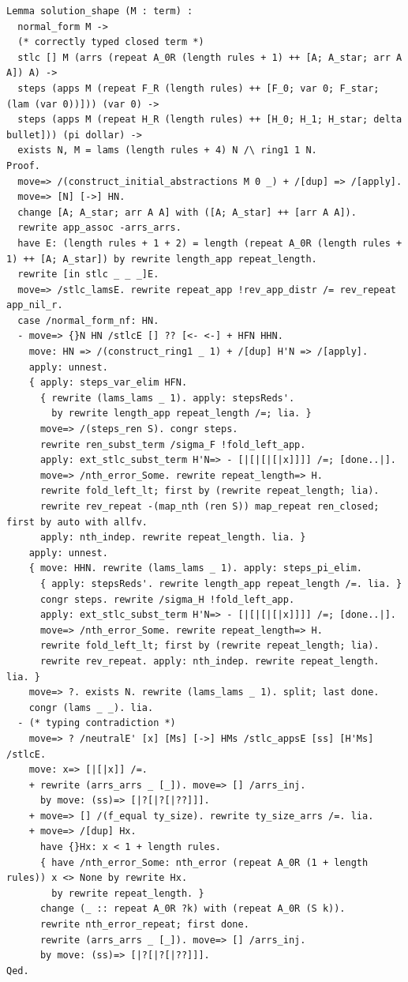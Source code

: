 \documentclass[10pt,a4paper]{amsart}
\begin{document}
\begin{lstlisting}
Lemma solution_shape (M : term) :
  normal_form M ->
  (* correctly typed closed term *)
  stlc [] M (arrs (repeat A_0R (length rules + 1) ++ [A; A_star; arr A A]) A) ->
  steps (apps M (repeat F_R (length rules) ++ [F_0; var 0; F_star; (lam (var 0))])) (var 0) ->
  steps (apps M (repeat H_R (length rules) ++ [H_0; H_1; H_star; delta bullet])) (pi dollar) ->
  exists N, M = lams (length rules + 4) N /\ ring1 1 N.
Proof.
  move=> /(construct_initial_abstractions M 0 _) + /[dup] => /[apply].
  move=> [N] [->] HN.
  change [A; A_star; arr A A] with ([A; A_star] ++ [arr A A]).
  rewrite app_assoc -arrs_arrs.
  have E: (length rules + 1 + 2) = length (repeat A_0R (length rules + 1) ++ [A; A_star]) by rewrite length_app repeat_length.
  rewrite [in stlc _ _ _]E.
  move=> /stlc_lamsE. rewrite repeat_app !rev_app_distr /= rev_repeat app_nil_r.
  case /normal_form_nf: HN.
  - move=> {}N HN /stlcE [] ?? [<- <-] + HFN HHN.
    move: HN => /(construct_ring1 _ 1) + /[dup] H'N => /[apply].
    apply: unnest.
    { apply: steps_var_elim HFN.
      { rewrite (lams_lams _ 1). apply: stepsReds'.
        by rewrite length_app repeat_length /=; lia. }
      move=> /(steps_ren S). congr steps.
      rewrite ren_subst_term /sigma_F !fold_left_app.
      apply: ext_stlc_subst_term H'N=> - [|[|[|[|x]]]] /=; [done..|].
      move=> /nth_error_Some. rewrite repeat_length=> H.
      rewrite fold_left_lt; first by (rewrite repeat_length; lia).
      rewrite rev_repeat -(map_nth (ren S)) map_repeat ren_closed; first by auto with allfv.
      apply: nth_indep. rewrite repeat_length. lia. }
    apply: unnest.
    { move: HHN. rewrite (lams_lams _ 1). apply: steps_pi_elim.
      { apply: stepsReds'. rewrite length_app repeat_length /=. lia. }
      congr steps. rewrite /sigma_H !fold_left_app.
      apply: ext_stlc_subst_term H'N=> - [|[|[|[|x]]]] /=; [done..|].
      move=> /nth_error_Some. rewrite repeat_length=> H.
      rewrite fold_left_lt; first by (rewrite repeat_length; lia).
      rewrite rev_repeat. apply: nth_indep. rewrite repeat_length. lia. }
    move=> ?. exists N. rewrite (lams_lams _ 1). split; last done.
    congr (lams _ _). lia.
  - (* typing contradiction *)
    move=> ? /neutralE' [x] [Ms] [->] HMs /stlc_appsE [ss] [H'Ms] /stlcE.
    move: x=> [|[|x]] /=.
    + rewrite (arrs_arrs _ [_]). move=> [] /arrs_inj.
      by move: (ss)=> [|?[|?[|??]]].
    + move=> [] /(f_equal ty_size). rewrite ty_size_arrs /=. lia.
    + move=> /[dup] Hx.
      have {}Hx: x < 1 + length rules.
      { have /nth_error_Some: nth_error (repeat A_0R (1 + length rules)) x <> None by rewrite Hx.
        by rewrite repeat_length. }
      change (_ :: repeat A_0R ?k) with (repeat A_0R (S k)).
      rewrite nth_error_repeat; first done.
      rewrite (arrs_arrs _ [_]). move=> [] /arrs_inj.
      by move: (ss)=> [|?[|?[|??]]].
Qed.


\end{lstlisting}
\end{document}
